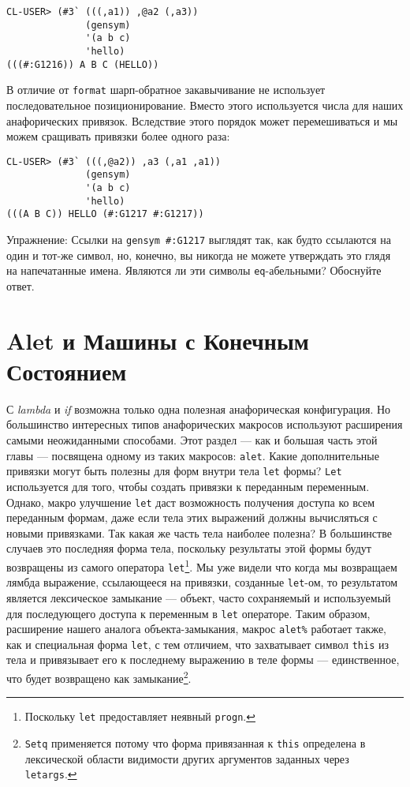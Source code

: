 \begin{verbatim}
CL-USER> (#3` (((,a1)) ,@a2 (,a3))
              (gensym)
              '(a b c)
              'hello)
(((#:G1216)) A B C (HELLO))
\end{verbatim}

В отличие от \verb"format" шарп-обратное закавычивание не использует последовательное позиционирование. Вместо этого используется числа для наших анафорических привязок. Вследствие этого порядок может перемешиваться и мы можем сращивать привязки более одного раза:

\begin{verbatim}
CL-USER> (#3` (((,@a2)) ,a3 (,a1 ,a1))
              (gensym)
              '(a b c)
              'hello)
(((A B C)) HELLO (#:G1217 #:G1217))
\end{verbatim}

Упражнение: Ссылки на \verb"gensym #:G1217" выглядят так, как будто ссылаются на один и тот-же символ, но, конечно, вы никогда не можете утверждать это глядя на напечатанные имена. Являются ли эти символы \verb"eq"-абельными? Обоснуйте ответ.

\section{Alet и Машины с Конечным Состоянием}\label{section_alet_and_finite_state_machines}


С \emph{lambda} и \emph{if} возможна только одна полезная анафорическая конфигурация. Но большинство интересных типов анафорических макросов используют расширения самыми неожиданными способами. Этот раздел --- как и большая часть этой главы --- посвящена одному из таких макросов: \verb"alet". Какие дополнительные привязки могут быть полезны для форм внутри тела \verb"let" формы? \verb"Let" используется для того, чтобы создать привязки к переданным переменным. Однако, макро улучшение \verb"let" даст возможность получения доступа ко всем переданным формам, даже если тела этих выражений должны вычисляться с новыми привязками. Так какая же часть тела наиболее полезна? В большинстве случаев это последняя форма тела, поскольку результаты этой формы будут возвращены из самого оператора \verb"let"\footnote{Поскольку \verb"let" предоставляет неявный \verb"progn".}. Мы уже видели что когда мы возвращаем лямбда выражение, ссылающееся на привязки, созданные \verb"let"-ом, то результатом является лексическое замыкание --- объект, часто сохраняемый и используемый для последующего доступа к переменным в \verb"let" операторе. Таким образом, расширение нашего аналога объекта-замыкания, макрос \verb"alet%" работает также, как и специальная форма \verb"let", с тем отличием, что захватывает символ \verb"this" из тела и привязывает его к последнему выражению в теле формы --- единственное, что будет возвращено как замыкание\footnote{\verb"Setq" применяется потому что форма привязанная к \verb"this" определена в лексической области видимости других аргументов заданных через \verb"letargs".}.


